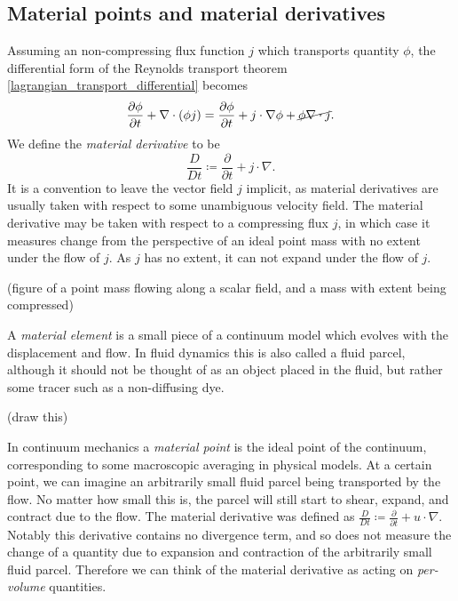 \documentclass[11pt,a4paper]{memoir}
\newcommand{\Part}[2]{\frac{\partial #1}{\partial #2}}
\begin{document}
\subsection{Material points and material derivatives}
Assuming an non-compressing flux function $j$ which transports quantity $\phi$, the differential form of the Reynolds transport theorem
\eqref{lagrangian_transport_differential} becomes
\begin{equation}
    \Part{\phi}{t} + \nabla\cdot(\phi j) = \Part{\phi}{t} + j\cdot\nabla\phi + \cancel{\phi \nabla\cdot j}.
\end{equation}
We define the \textit{material derivative} to be
\begin{equation}\label{material_derivative}
    \frac{D}{Dt} \coloneqq \Part{}{t} + j\cdot\nabla.
\end{equation}
It is a convention to leave the vector field $j$ implicit, as material derivatives are usually taken with respect to some unambiguous velocity field.
The material derivative may be taken with respect to a compressing flux $j$, in which case it measures change from the perspective of an
ideal point mass with no extent under the flow of $j$. As $j$ has no extent, it can not expand under the flow of $j$.

\vskip 0.2in
(figure of a point mass flowing along a scalar field, and a mass with extent being compressed)
\vskip 0.2in

A \textit{material element} is a small piece of a continuum model which evolves with the displacement and flow.
In fluid dynamics this is also called a fluid parcel, although it should not be thought of as an object placed in the fluid, but
rather some tracer such as a non-diffusing dye.

\vskip 0.2in
(draw this)
\vskip 0.2in

In continuum mechanics a \textit{material point} is the ideal point of the continuum, corresponding to some macroscopic averaging in physical models.
At a certain point, we can imagine an arbitrarily small fluid parcel being transported by the flow.
No matter how small this is, the parcel will still start to shear, expand, and contract due
to the flow.
The material derivative was defined as $\frac{D}{Dt} \coloneqq \Part{}{t} + u\cdot\nabla$. Notably this derivative contains no divergence term, and so does not measure the
change of a quantity due to expansion and contraction of the arbitrarily small fluid parcel. Therefore we can think of the material derivative as acting
on \textit{per-volume} quantities.
\end{document}
